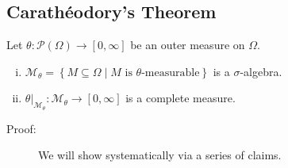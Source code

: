 \documentclass[10pt]{extarticle}
\begin{document}
  \subsection{Carathéodory's Theorem}%
  Let $\theta: \mathcal{P}(\Omega)\rightarrow [0,\infty]$ be an outer measure on $\Omega$.
  \begin{enumerate}[(i)]
    \item $\displaystyle \mathcal{M}_{\theta} = \left\{M\subseteq \Omega\mid M\text{ is $\theta$-measurable}\right\}$ is a $\sigma$-algebra.
    \item $\displaystyle \theta\vert_{\mathcal{M}_{\theta}}: \mathcal{M}_{\theta}\rightarrow [0,\infty]$ is a complete measure.
  \end{enumerate}
  \begin{description}
    \item[Proof:] We will show systematically via a series of claims.\\


\end{description}
\end{document}
